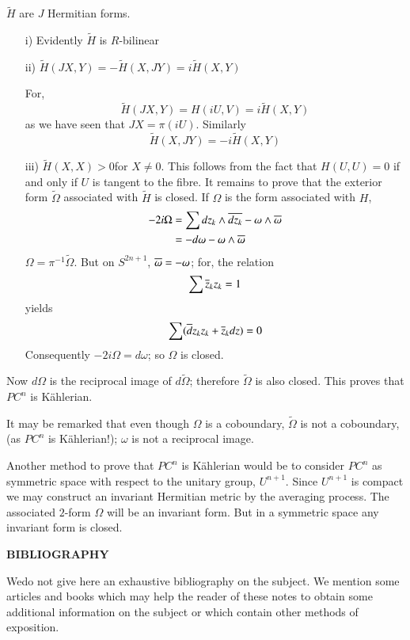 $\widetilde{H}$ are $J$ Hermitian forms.
\begin{itemize}
\item[i)] Evidently $\widetilde{H}$ is $R$-bilinear

\item[ii)] $\widetilde{H}(JX,Y)=-\widetilde{H}(X,JY)=i\widetilde{H}(X,Y)$

For,
$$
\widetilde{H}(JX,Y)=H(iU,V)=i\widetilde{H}(X,Y)
$$
as we have seen that $JX=\pi(iU)$. Similarly
$$
\widetilde{H}(X,JY)=-i\widetilde{H}(X,Y)
$$

\item[iii)] $\tilde{H}(X,X)>0$\pageoriginale for $X\neq 0$. This follows from
  the fact that $H(U,U)=0$ if and only if $U$ is tangent to the
  fibre. It remains to prove that the exterior form
  $\widetilde{\Omega}$ associated with $\widetilde{H}$ is closed. If
  $\Omega$ is the form associated with $H$,
\begin{align*}
-2i\Omega &= \sum dz_{k}\wedge \overline{dz_{k}}-\omega\wedge \overline{\omega}\\
          &= -d\omega-\omega\wedge \overline{\omega}
\end{align*}
$\Omega=\pi^{-1}\widetilde{\Omega}$. But on $S^{2n+1}$,
$\overline{\omega}=-\omega$; for, the relation 
$$
\sum \overline{z}_{k}z_{k}=1
$$
yields
$$
\sum(\overline{d}z_{k}z_{k}+\overline{z}_{k}dz)=0
$$
Consequently $-2i\Omega=d\omega$; so $\Omega$ is closed.
\end{itemize}

Now $d\Omega$ is the reciprocal image of $d\widetilde{\Omega}$;
therefore $\widetilde{\Omega}$ is also closed. This proves that
$PC^{n}$ is K\"ahlerian.

It may be remarked that even though $\Omega$ is a coboundary,
$\widetilde{\Omega}$ is not a coboundary, (as $PC^{n}$ is
K\"ahlerian!); $\omega$ is not a reciprocal image.

Another method to prove that $PC^{n}$ is K\"ahlerian would be to
consider $PC^{n}$ as symmetric space with respect to the unitary
group, $U^{n+1}$. Since $U^{n+1}$ is compact we may construct an
invariant Hermitian metric by the averaging process. The associated
$2$-form $\Omega$ will be an invariant form. But in a symmetric space
any invariant form is closed.

\vskip 1cm

\begin{center}
{\bf BIBLIOGRAPHY}
\end{center}

We\pageoriginale do not give here an exhaustive bibliography on the
subject. We mention some articles and books which may help the reader
of these notes to obtain some additional information on the subject or
which contain other methods of exposition.

